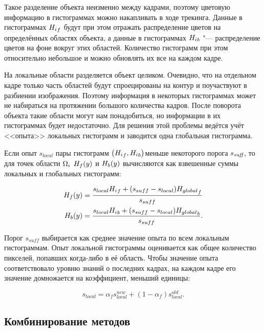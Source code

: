 Такое разделение объекта неизменно между кадрами, поэтому цветовую информацию
в гистограммах можно накапливать в ходе трекинга.
Данные в гистограммах ${H_i}_f$ будут при этом отражать распределение
цветов на определённых областях объекта, а данные в гистограммах ${H_i}_b$
"--- распределение цветов на фоне вокруг этих областей.
Количество гистограмм при этом относительно небольшое и можно 
обновлять их все на каждом кадре.

На локальные области разделяется объект целиком. 
Очевидно, что на отдельном кадре только часть областей будут спроецированы на
контур и поучаствуют в разбиении изображения.
Поэтому информация в некоторых гистограммах может не набираться на протяжении
большого количества кадров.
После поворота объекта такие области могут нам понадобиться, но информации в
их гистограммах будет недостаточно.
Для решения этой проблемы ведётся учёт <<опыта>> локальных гистограмм и
заводится одна глобальная гистограмма.

Если опыт $s_{local}$ пары гистограмм $\left( {H_i}_f, {H_i}_b \right)$меньше некоторого порога
$s_{\text{\it suff}}$, то для точек области $\Omega_i$ $H_f(y)$ и $H_b(y)$
вычисляются
как
взвешенные суммы локальных и глобальных гистограмм:

\begin{align}
\label{eqn:histo_skill}
    H_f(y) &= \dfrac{s_{local} {H_i}_f + (s_{suff} - s_{local})
        {H_{global}}_f}{s_{suff}} \\
    H_b(y) &= \dfrac{s_{local} {H_i}_b + (s_{suff} - s_{local})
        {H_{global}}_b}{s_{suff}}
\text{.}
\end{align}

Порог $s_{suff}$ выбирается как среднее значение опыта по всем локальным
гистограммам.
Опыт локальной гистограммы оценивается как общее количество пикселей, попавших
когда-либо в её область.
Чтобы значение опыта соответствовало уровню знаний о последних кадрах, на
каждом кадре его значение домножается на коэффициент, меньший единицы:

\begin{equation}
s_{local} =  \alpha_f s_{local}^{new} + (1 - \alpha_f)  s_{local}^{old} 
\text{.}
\end{equation}


\subsection{Комбинирование методов}


